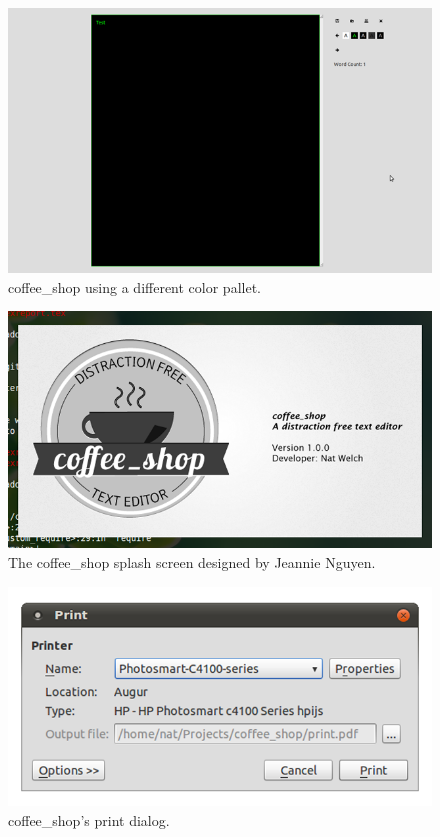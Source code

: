 \documentclass[10pt]{article}
\begin{document}
\begin{figure}
   \centering
      \includegraphics[width=130mm]{images/coffee_shop3.png}
   \caption{coffee\_shop using a different color pallet.}
\end{figure}

\begin{figure}
   \centering
      \includegraphics[width=130mm]{images/coffee_shop4.png}
   \caption{The coffee\_shop splash screen designed by Jeannie Nguyen\protect\cite{jeannie}.}
\end{figure}

\begin{figure}
   \centering
      \includegraphics[width=130mm]{images/coffee_shop5.png}
   \caption{coffee\_shop's print dialog.}
\end{figure}
\end{document}
